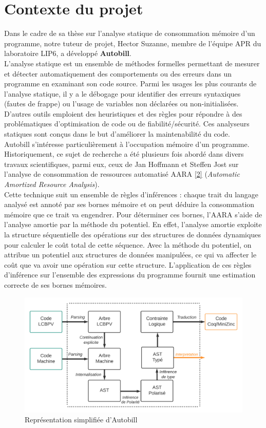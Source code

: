 \documentclass[12pt]{article}
\begin{document}
{
      \hypersetup{linkcolor=}
      \setcounter{tocdepth}{3}
      \tableofcontents
}
\newpage

\section{Contexte du projet}\label{contexte-du-projet}
Dans le cadre de sa thèse sur l'analyse statique de consommation
mémoire d'un programme, notre tuteur de projet, Hector Suzanne, membre de l'équipe APR du laboratoire LIP6, a développé \textbf{Autobill}. \\
L'analyse statique est un ensemble de méthodes formelles permettant de
mesurer et détecter automatiquement des comportements ou des erreurs dans un
programme en examinant son code source. Parmi les usages les plus courants
de l'analyse statique, il y a le débogage pour identifier des erreurs
syntaxiques (fautes de frappe) ou l'usage de variables non déclarées ou
non-initialisées. D'autres outils emploient des heuristiques et des règles pour répondre à des problématiques d'optimisation de code ou de fiabilité/sécurité. Ces analyseurs statiques sont conçus dans le but d'améliorer la maintenabilité du code. \\
Autobill s'intéresse particulièrement à l'occupation mémoire d'un programme. Historiquement,
ce sujet de recherche a été plusieurs fois abordé dans divers travaux scientifiques, parmi eux, ceux de Jan Hoffmann et Steffen Jost sur l'analyse de consommation de ressources automatisé AARA
\protect\hyperlink{ref-Hoffmann}{{[}2{]}} (\emph{Automatic Amortized
      Resource Analysis}).\\
Cette technique suit un ensemble de règles d'inférences : chaque trait du langage analysé est annoté par ses bornes mémoire et on peut déduire la consommation mémoire que ce trait va engendrer. Pour déterminer ces bornes, l'AARA s'aide de l'analyse amortie par la méthode du potentiel. En effet, l'analyse amortie exploite la structure séquentielle des opérations sur des structures de données dynamiques pour calculer le coût total de cette séquence. Avec la méthode du potentiel, on attribue un potentiel aux structures de données manipulées, ce qui va affecter le coût que va avoir une opération sur cette structure. L’application de ces règles d'inférence sur l'ensemble des expressions du programme fournit une estimation correcte de ses bornes mémoires.
\begin{figure}[!b]
      \centering
      \includegraphics[scale=0.55]{Figures/Schema_Autobill.png}
      \caption{Représentation simplifiée d'Autobill\label{fig1}}
\end{figure}
\end{document}
